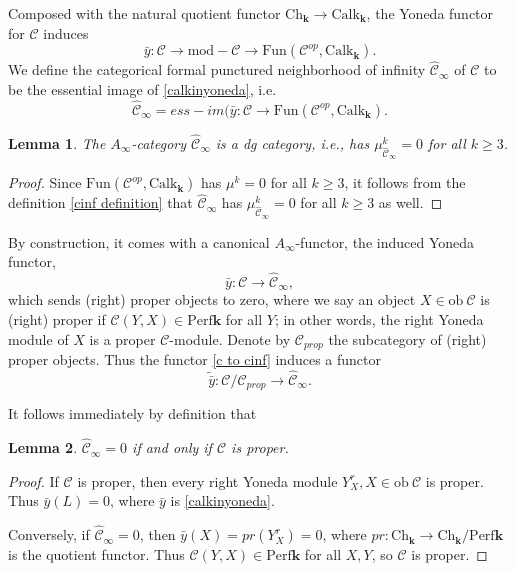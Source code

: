 \documentclass[11pt]{amsproc}
\def\K{{\mathbf{k}}}
\def\cc{\mathcal{C}}
\def\rmod{\mathrm{mod\!-\!}}
\def\ainf{A_\infty}
\def\ob{\mathrm{ob\ }}
\def\ch{\mathrm{Ch}}
\def\perf{\mathrm{Perf}}
\def\calk{\mathrm{Calk}}
\def\fun{\mathrm{Fun}}
\def\cinf{\widehat{\cc}_{\infty}}
\newtheorem{lem}{Lemma}[section]
\theoremstyle{remark}
\numberwithin{equation}{section}
\begin{document}
Composed with the natural quotient functor $\ch_{\K} \to \calk_{\K}$, the Yoneda functor for $\cc$ induces
\begin{equation}\label{calkinyoneda}
\bar{y}: \cc \to \rmod \cc \to \fun(\cc^{op}, \calk_{\K}).
\end{equation}
We define the categorical formal punctured neighborhood of infinity $\cinf$ of $\cc$ to be the essential image of \eqref{calkinyoneda}, i.e.
\begin{equation}\label{cinf definition}
\cinf = ess-im(\bar{y}: \cc \to \fun(\cc^{op}, \calk_{\K}).
\end{equation}

\begin{lem}\label{lem: cinf is dg}
The $\ainf$-category $\cinf$ is a dg category, i.e., has $\mu^{k}_{\cinf} = 0$ for all $k \ge 3$.
\end{lem}
\begin{proof}
Since $\fun(\cc^{op}, \calk_{\K})$ has $\mu^{k} = 0$ for all $k \ge 3$,
it follows from the definition \eqref{cinf definition} that $\cinf$ has $\mu^{k}_{\cinf} = 0$ for all $k \ge 3$ as well.
\end{proof}

By construction, it comes with a canonical $\ainf$-functor, the induced Yoneda functor,
\begin{equation}\label{c to cinf}
\bar{y}: \cc \to \cinf,
\end{equation}
which sends (right) proper objects to zero,
where we say an object $X \in \ob \cc$ is (right) proper if $\cc(Y, X) \in \perf \K$ for all $Y$;
in other words, the right Yoneda module of $X$ is a proper $\cc$-module.
Denote by $\cc_{prop}$ the subcategory of (right) proper objects.
Thus the functor \eqref{c to cinf} induces a functor
\begin{equation}\label{cmodprop to cinf1}
\tilde{\bar{y}}: \cc/\cc_{prop} \to \cinf.
\end{equation}

It follows immediately by definition that

\begin{lem}\label{lem: cinf=0cproper}
$\cinf = 0$ if and only if $\cc$ is proper.
\end{lem}
\begin{proof}
If $\cc$ is proper, then every right Yoneda module $Y^{r}_{X}, X \in \ob \cc$ is proper.
Thus $\bar{y}(L) = 0$, where $\bar{y}$ is \eqref{calkinyoneda}.

Conversely, if $\cinf=0$, then $\bar{y}(X) = pr(Y^{r}_{X}) = 0$, where $pr: \ch_{\K} \to \ch_{\K}/\perf \K$ is the quotient functor. 
Thus $\cc(Y, X) \in \perf \K$ for all $X, Y$, so $\cc$ is proper. 
\end{proof}
\end{document}
